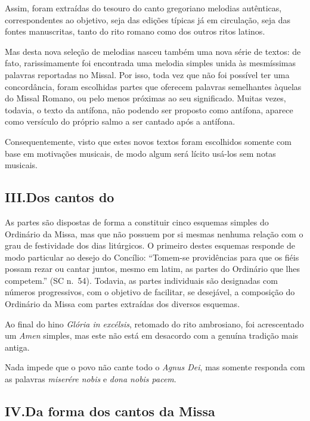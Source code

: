  Assim, foram extraídas do tesouro do canto gregoriano melodias autênticas, correspondentes ao objetivo, seja das edições típicas já em circulação, seja das fontes manuscritas, tanto do rito romano como dos outros ritos latinos.

 Mas desta nova seleção de melodias nasceu também uma nova série de textos: de fato, rarissimamente foi encontrada uma melodia simples unida às mesmíssimas palavras reportadas no Missal. Por isso, toda vez que não foi possível ter uma concordância, foram escolhidas partes que oferecem palavras semelhantes àquelas do Missal Romano, ou pelo menos próximas ao seu significado. Muitas vezes, todavia, o texto da antífona, não podendo ser proposto como antífona, aparece como versículo do próprio salmo a ser cantado após a antífona.

 Consequentemente, visto que estes novos textos foram escolhidos somente com base em motivações musicais, de modo algum será lícito usá-los sem notas musicais.

\subsection{III.\@ Dos cantos do {\KS}}\label{subsection:praenotanda-3}

 As partes são dispostas de forma a constituir cinco esquemas simples do Ordinário da Missa, mas que não possuem por si mesmas nenhuma relação com o grau de festividade dos dias litúrgicos. O primeiro destes esquemas responde de modo particular ao desejo do Concílio: ``Tomem-se providências para que os fiéis possam rezar ou cantar juntos, mesmo em latim, as partes do Ordinário que lhes competem.'' (SC n.\ 54). Todavia, as partes individuais são designadas com números progressivos, com o objetivo de facilitar, se desejável, a composição do Ordinário da Missa com partes extraídas dos diversos esquemas.

 Ao final do hino \textcolor{gregoriocolor}{\emph{Glória in excélsis}}, retomado do rito ambrosiano, foi acrescentado um \textcolor{gregoriocolor}{\emph{Amen}} simples, mas este não está em desacordo com a genuína tradição mais antiga.

 Nada impede que o povo não cante todo o \textcolor{gregoriocolor}{\emph{Agnus Dei}}, mas somente responda com as palavras \textcolor{gregoriocolor}{\emph{miserére nobis}} e \textcolor{gregoriocolor}{\emph{dona nobis pacem}}.

\subsection{IV.\@ Da forma dos cantos da Missa}


